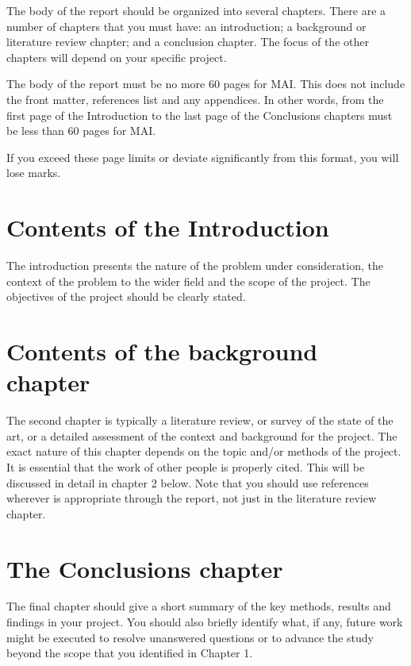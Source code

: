 The body of the report should be organized into several chapters. There are a number of chapters that you must have: an introduction; a background or literature review chapter; and a conclusion chapter. The focus of the other chapters will depend on your specific project.

The body of the report must be no more 60 pages for MAI. This does not include the front matter, references list and any appendices. In other words, from the first page of the Introduction to the last page of the Conclusions chapters must be less than 60 pages for MAI.

If you exceed these page limits or deviate significantly from this format, you will lose marks.

\section{Contents of the Introduction}
The introduction presents the nature of the problem under consideration, the context of the problem to the wider field and the scope of the project. The objectives of the project should be clearly stated.

\section{Contents of the background chapter}
The second chapter is typically a literature review, or survey of the state of the art, or a detailed assessment of the context and background for the project. The exact nature of this chapter depends on the topic and/or methods of the project. It is essential that the work of other people is properly cited. This will be discussed in detail in chapter 2 below. Note that you should use references wherever is appropriate through the report, not just in the literature review chapter.

\section{The Conclusions chapter}
The final chapter should give a short summary of the key methods, results and findings in your project. You should also briefly identify what, if any, future work might be executed to resolve unanswered questions or to advance the study beyond the scope that you identified in Chapter 1.
